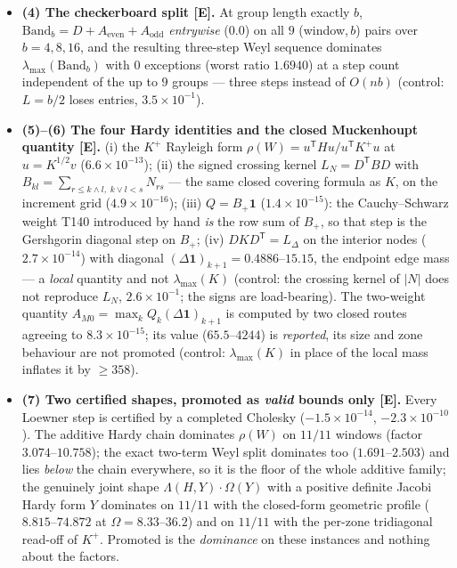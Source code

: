 \documentclass[11pt]{article}
\providecommand{\mE}{\textbf{[E]}}\providecommand{\mC}{\textbf{[C]}}
\begin{document}
\begin{itemize}[leftmargin=1.5em]
measurement, no law).
\item \textbf{(4) The checkerboard split \mE.} At group length exactly $b$,
$\mathrm{Band}_b=D+A_{\mathrm{even}}+A_{\mathrm{odd}}$ \emph{entrywise} ($0.0$) on all $9$
(window,\,$b$) pairs over $b=4,8,16$, and the resulting three-step Weyl sequence dominates
$\lambda_{\max}(\mathrm{Band}_b)$ with $0$ exceptions (worst ratio $1.6940$) at a step count
independent of the up to $9$ groups --- three steps instead of $O(nb)$ (control: $L=b/2$ loses
entries, $3.5\times10^{-1}$).
\item \textbf{(5)--(6) The four Hardy identities and the closed Muckenhoupt quantity \mE.} (i) the
$K^{+}$ Rayleigh form $\rho(W)=u^{\mathsf T}Hu/u^{\mathsf T}K^{+}u$ at $u=K^{1/2}v$
($6.6\times10^{-13}$); (ii) the signed crossing kernel $L_N=D^{\mathsf T}BD$ with
$B_{kl}=\sum_{r\le k\wedge l,\;k\vee l<s}N_{rs}$ --- the same closed covering formula as $K$, on the
increment grid ($4.9\times10^{-16}$); (iii) $Q=B_+\mathbf 1$ ($1.4\times10^{-15}$): the
Cauchy--Schwarz weight T140 introduced by hand \emph{is} the row sum of $B_+$, so that step is the
Gershgorin diagonal step on $B_+$; (iv) $DKD^{\mathsf T}=L_\Delta$ on the interior nodes
($2.7\times10^{-14}$) with diagonal $(\Delta\mathbf 1)_{k+1}=0.4886$--$15.15$, the endpoint edge
mass --- a \emph{local} quantity and not $\lambda_{\max}(K)$ (control: the crossing kernel of $|N|$
does not reproduce $L_N$, $2.6\times10^{-1}$; the signs are load-bearing). The two-weight quantity
$A_{M0}=\max_kQ_k(\Delta\mathbf 1)_{k+1}$ is computed by two closed routes agreeing to
$8.3\times10^{-15}$; its value ($65.5$--$4244$) is \emph{reported}, its size and zone behaviour are
not promoted (control: $\lambda_{\max}(K)$ in place of the local mass inflates it by $\ge358$).
\item \textbf{(7) Two certified shapes, promoted as \emph{valid} bounds only \mE.} Every Loewner
step is certified by a completed Cholesky ($-1.5\times10^{-14}$, $-2.3\times10^{-10}$). The additive
Hardy chain dominates $\rho(W)$ on $11/11$ windows (factor $3.074$--$10.758$); the exact two-term
Weyl split dominates too ($1.691$--$2.503$) and lies \emph{below} the chain everywhere, so it is the
floor of the whole additive family; the genuinely joint shape $\Lambda(H,Y)\cdot\Omega(Y)$ with a
positive definite Jacobi Hardy form $Y$ dominates on $11/11$ with the closed-form geometric profile
($8.815$--$74.872$ at $\Omega=8.33$--$36.2$) and on $11/11$ with the per-zone tridiagonal read-off of
$K^{+}$. Promoted is the \emph{dominance} on these instances and nothing about the factors.

\end{itemize}
\end{document}
